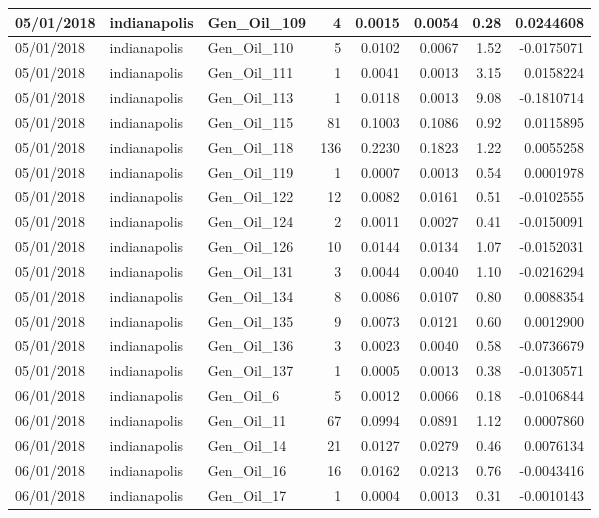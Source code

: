 \documentclass[
  letterpaper,
  DIV=11,
  numbers=noendperiod]{scrartcl}
\begin{document}
\begin{tabular}{l|l|l|r|r|r|r|r}
\hline
05/01/2018 & indianapolis & Gen\_Oil\_109 & 4 & 0.0015 & 0.0054 & 0.28 & 0.0244608\\
\hline
05/01/2018 & indianapolis & Gen\_Oil\_110 & 5 & 0.0102 & 0.0067 & 1.52 & -0.0175071\\
\hline
05/01/2018 & indianapolis & Gen\_Oil\_111 & 1 & 0.0041 & 0.0013 & 3.15 & 0.0158224\\
\hline
05/01/2018 & indianapolis & Gen\_Oil\_113 & 1 & 0.0118 & 0.0013 & 9.08 & -0.1810714\\
\hline
05/01/2018 & indianapolis & Gen\_Oil\_115 & 81 & 0.1003 & 0.1086 & 0.92 & 0.0115895\\
\hline
05/01/2018 & indianapolis & Gen\_Oil\_118 & 136 & 0.2230 & 0.1823 & 1.22 & 0.0055258\\
\hline
05/01/2018 & indianapolis & Gen\_Oil\_119 & 1 & 0.0007 & 0.0013 & 0.54 & 0.0001978\\
\hline
05/01/2018 & indianapolis & Gen\_Oil\_122 & 12 & 0.0082 & 0.0161 & 0.51 & -0.0102555\\
\hline
05/01/2018 & indianapolis & Gen\_Oil\_124 & 2 & 0.0011 & 0.0027 & 0.41 & -0.0150091\\
\hline
05/01/2018 & indianapolis & Gen\_Oil\_126 & 10 & 0.0144 & 0.0134 & 1.07 & -0.0152031\\
\hline
05/01/2018 & indianapolis & Gen\_Oil\_131 & 3 & 0.0044 & 0.0040 & 1.10 & -0.0216294\\
\hline
05/01/2018 & indianapolis & Gen\_Oil\_134 & 8 & 0.0086 & 0.0107 & 0.80 & 0.0088354\\
\hline
05/01/2018 & indianapolis & Gen\_Oil\_135 & 9 & 0.0073 & 0.0121 & 0.60 & 0.0012900\\
\hline
05/01/2018 & indianapolis & Gen\_Oil\_136 & 3 & 0.0023 & 0.0040 & 0.58 & -0.0736679\\
\hline
05/01/2018 & indianapolis & Gen\_Oil\_137 & 1 & 0.0005 & 0.0013 & 0.38 & -0.0130571\\
\hline
06/01/2018 & indianapolis & Gen\_Oil\_6 & 5 & 0.0012 & 0.0066 & 0.18 & -0.0106844\\
\hline
06/01/2018 & indianapolis & Gen\_Oil\_11 & 67 & 0.0994 & 0.0891 & 1.12 & 0.0007860\\
\hline
06/01/2018 & indianapolis & Gen\_Oil\_14 & 21 & 0.0127 & 0.0279 & 0.46 & 0.0076134\\
\hline
06/01/2018 & indianapolis & Gen\_Oil\_16 & 16 & 0.0162 & 0.0213 & 0.76 & -0.0043416\\
\hline
06/01/2018 & indianapolis & Gen\_Oil\_17 & 1 & 0.0004 & 0.0013 & 0.31 & -0.0010143\\

\end{tabular}
\end{document}
